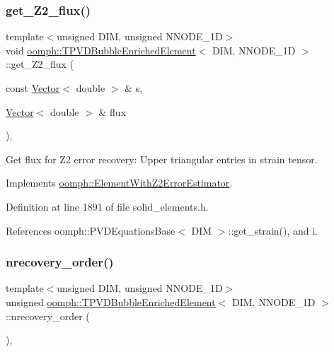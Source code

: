 \subsubsection{\texorpdfstring{get\+\_\+\+Z2\+\_\+flux()}{get\_Z2\_flux()}}
{\footnotesize\ttfamily template$<$unsigned D\+IM, unsigned N\+N\+O\+D\+E\+\_\+1D$>$ \\
void \hyperlink{classoomph_1_1TPVDBubbleEnrichedElement}{oomph\+::\+T\+P\+V\+D\+Bubble\+Enriched\+Element}$<$ D\+IM, N\+N\+O\+D\+E\+\_\+1D $>$\+::get\+\_\+\+Z2\+\_\+flux (\begin{DoxyParamCaption}\item[{const \hyperlink{classoomph_1_1Vector}{Vector}$<$ double $>$ \&}]{s,  }\item[{\hyperlink{classoomph_1_1Vector}{Vector}$<$ double $>$ \&}]{flux }\end{DoxyParamCaption})\hspace{0.3cm}{\ttfamily [inline]}, {\ttfamily [virtual]}}



Get \textquotesingle{}flux\textquotesingle{} for Z2 error recovery\+: Upper triangular entries in strain tensor. 



Implements \hyperlink{classoomph_1_1ElementWithZ2ErrorEstimator_a5688ff5f546d81771cabad82ca5a7556}{oomph\+::\+Element\+With\+Z2\+Error\+Estimator}.



Definition at line 1891 of file solid\+\_\+elements.\+h.



References oomph\+::\+P\+V\+D\+Equations\+Base$<$ D\+I\+M $>$\+::get\+\_\+strain(), and i.

\mbox{\label{classoomph_1_1TPVDBubbleEnrichedElement_a865b7401a12a822e3d24c58f7418fb97}} 
\subsubsection{\texorpdfstring{nrecovery\+\_\+order()}{nrecovery\_order()}}
{\footnotesize\ttfamily template$<$unsigned D\+IM, unsigned N\+N\+O\+D\+E\+\_\+1D$>$ \\
unsigned \hyperlink{classoomph_1_1TPVDBubbleEnrichedElement}{oomph\+::\+T\+P\+V\+D\+Bubble\+Enriched\+Element}$<$ D\+IM, N\+N\+O\+D\+E\+\_\+1D $>$\+::nrecovery\+\_\+order (\begin{DoxyParamCaption}{ }\end{DoxyParamCaption})\hspace{0.3cm}{\ttfamily [inline]}, {\ttfamily [virtual]}}



